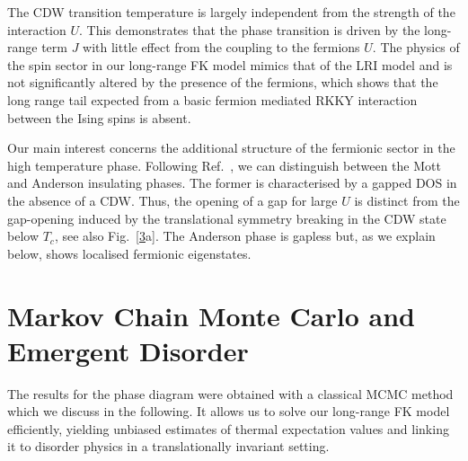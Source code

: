 The CDW transition temperature is largely independent from the strength of the interaction \(U\). This demonstrates that the phase transition is driven by the long-range term \(J\) with little effect from the coupling to the fermions \(U\). The physics of the spin sector in our long-range {FK} model mimics that of the {LRI} model and is not significantly altered by the presence of the fermions, which shows that the long range tail expected from a basic fermion mediated RKKY interaction between the Ising spins is absent.

Our main interest concerns the additional structure of the fermionic sector in the high temperature phase. Following Ref.~\autocite{antipovInteractionTunedAndersonMott2016}, we can distinguish between the Mott and Anderson insulating phases. The former is characterised by a gapped {DOS} in the absence of a {CDW}. Thus, the opening of a gap for large \(U\) is distinct from the gap-opening induced by the translational symmetry breaking in the CDW state below \(T_c\), see also Fig.~{[}\protect\hyperlink{fig:band_opening}{3}a{]}. The Anderson phase is gapless but, as we explain below, shows localised fermionic eigenstates.

\hypertarget{markov-chain-monte-carlo-and-emergent-disorder}{%
\section{Markov Chain Monte Carlo and Emergent Disorder}\label{markov-chain-monte-carlo-and-emergent-disorder}}

The results for the phase diagram were obtained with a classical {MCMC} method which we discuss in the following. It allows us to solve our long-range {FK} model efficiently, yielding unbiased estimates of thermal expectation values and linking it to disorder physics in a translationally invariant setting.

